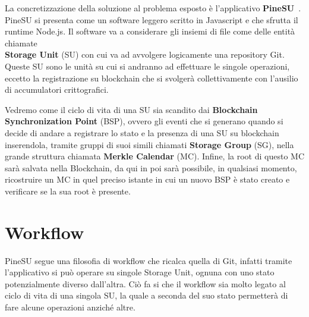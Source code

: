 
La concretizzazione della soluzione al problema esposto è l’applicativo \textbf{PineSU}~\cite{pinesu-github-21}. \\
PineSU si presenta come un software leggero scritto in Javascript e che sfrutta il runtime Node.js.
Il software va a considerare gli insiemi di file come delle entità chiamate \\
\textbf{Storage Unit} (SU) con cui va ad avvolgere logicamente una repository Git. \\
Queste SU sono le unità su cui si andranno ad effettuare le singole
operazioni, eccetto la registrazione su blockchain che si svolgerà collettivamente con l’ausilio di accumulatori crittografici. 

Vedremo come il ciclo di vita di una SU sia scandito dai \textbf{Blockchain Synchronization Point} (BSP),
ovvero gli eventi che si generano quando si decide di andare a registrare lo stato e la presenza di una SU su blockchain inserendola,
tramite gruppi di suoi simili chiamati \textbf{Storage Group} (SG), nella grande struttura chiamata \textbf{Merkle Calendar} (MC).
Infine, la root di questo MC sarà salvata nella Blockchain, da qui in poi sarà possibile, in qualsiasi momento, ricostruire un MC in quel preciso istante in cui un nuovo BSP è stato creato e verificare se la sua root è presente.

\section{Workflow}
\label{sec:work}

PineSU segue una filosofia di workflow che ricalca quella di Git,
infatti tramite l’applicativo si può operare su singole Storage Unit, ognuna con uno stato potenzialmente
diverso dall’altra. Ciò fa si che il workflow sia molto legato al ciclo di vita di una singola SU, la quale
a seconda del suo stato permetterà di fare alcune operazioni anziché altre.

